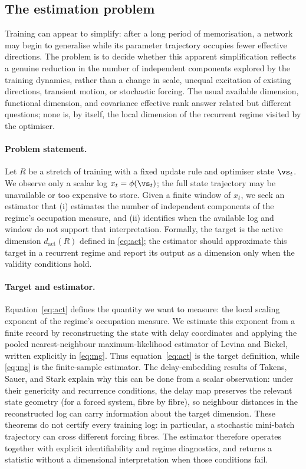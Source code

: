 \documentclass{article}
\newenvironment{claude}{\color{claudecolor}}{}
\begin{document}
\begin{claude}
\subsection{The estimation problem}\label{sec:problem-formulation}

Training can appear to simplify: after a long period of memorisation, a network may begin to
generalise while its parameter trajectory occupies fewer effective directions. The problem is to
decide whether this apparent simplification reflects a genuine reduction in the number of
independent components explored by the training dynamics, rather than a change in scale, unequal
excitation of existing directions, transient motion, or stochastic forcing. The usual available
dimension, functional dimension, and covariance effective rank answer related but different
questions; none is, by itself, the local dimension of the recurrent regime visited by the optimiser.

\paragraph{Problem statement.} Let $R$ be a stretch of training with a fixed update rule and
optimiser state $\vs_t$. We observe only a scalar log $x_t = \phi(\vs_t)$; the full state trajectory
may be unavailable or too expensive to store. Given a finite window of $x_t$, we seek an estimator
that (i) estimates the number of independent components of the regime's occupation measure, and
(ii) identifies when the available log and window do not support that interpretation. Formally, the
target is the active dimension $d_{\mathrm{act}}(R)$ defined in \cref{eq:act}; the estimator should
approximate this target in a recurrent regime and report its output as a dimension only when the
validity conditions hold.

\paragraph{Target and estimator.} Equation~\cref{eq:act} defines the quantity we want to measure:
the local scaling exponent of the regime's occupation measure. We estimate this exponent from a
finite record by reconstructing the state with delay coordinates and applying the pooled
nearest-neighbour maximum-likelihood estimator of Levina and Bickel, written explicitly in
\cref{eq:mg}. Thus equation~\cref{eq:act} is the target definition, while \cref{eq:mg} is the
finite-sample estimator. The delay-embedding results of Takens, Sauer, and Stark explain why this
can be done from a scalar observation: under their genericity and recurrence conditions, the delay
map preserves the relevant state geometry (for a forced system, fibre by fibre), so neighbour
distances in the reconstructed log can carry information about the target dimension. These theorems
do not certify every training log: in particular, a stochastic mini-batch trajectory can cross
different forcing fibres. The estimator therefore operates together with explicit identifiability
and regime diagnostics, and returns a statistic without a dimensional interpretation when those
conditions fail.


\end{claude}
\end{document}
